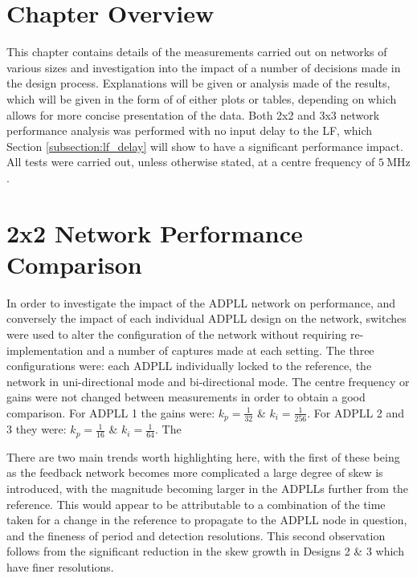 \section{Chapter Overview}
This chapter contains details of the measurements carried out on networks of various sizes and investigation into the impact of a number of decisions made in the design process. Explanations will be given or analysis made of the results, which will be given in the form of of either plots or tables, depending on which allows for more concise presentation of the data. Both 2x2 and 3x3 network performance analysis was performed with no input delay to the \ac{LF}, which Section \ref{subsection:lf_delay} will show to have a significant performance impact. All tests were carried out, unless otherwise stated, at a centre frequency of $5~\si{\mega\hertz}$.

\section{2x2 Network Performance Comparison}
In order to investigate the impact of the \ac{ADPLL} network on performance, and conversely the impact of each individual \ac{ADPLL} design on the network, switches were used to alter the configuration of the network without requiring re-implementation and a number of captures made at each setting. The three configurations were: each \ac{ADPLL} individually locked to the reference, the network in uni-directional mode and bi-directional mode. The centre frequency or gains were not changed between measurements in order to obtain a good comparison. For \ac{ADPLL} 1 the gains were: $k_p = \frac{1}{32}$ \& $k_i = \frac{1}{256}$. For \ac{ADPLL} 2 and 3 they were: $k_p = \frac{1}{16}$ \& $k_i = \frac{1}{64}$. The

There are two main trends worth highlighting here, with the first of these being as the feedback network becomes more complicated a large degree of skew is introduced, with the magnitude becoming larger in the \acp{ADPLL} further from the reference. This would appear to be attributable to a combination of the time taken for a change in the reference to propagate to the \ac{ADPLL} node in question, and the fineness of period and detection resolutions. This second observation follows from the significant reduction in the skew growth in Designs 2 \& 3 which have finer resolutions.


